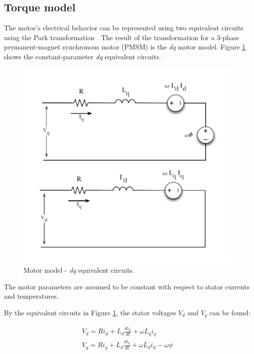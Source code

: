 \documentclass[../SimBALink.tex]{subfiles}
\begin{document}
	\subsection{Torque model}
		The motor's electrical behavior can be represented using two equivalent circuits using the Park transformation \cite{Park1929}. The result of the transformation for a 3-phase permanent-magnet synchronous motor (PMSM) is the \textit{dq} motor model. Figure \ref{fig:Motor_equivalent_circuit} shows the constant-parameter \textit{dq} equivalent circuits.
		
		\begin{figure}[h]
			\centering
			\includegraphics[width=\linewidth]{Motor_equivalent_circuit}
			\caption{Motor model - \textit{dq} equivalent circuits.}
			\label{fig:Motor_equivalent_circuit}
		\end{figure}
		\FloatBarrier
		
		The motor parameters are assumed to be constant with respect to stator currents and temperatures.
		
		By the equivalent circuits in Figure \ref{fig:Motor_equivalent_circuit}, the stator voltages $V_d$ and $V_q$ can be found:
		
		\begin{gather}
			V_d		= R i_d + L_d \frac{ d i_d }{ d t } + \omega L_q i_q				\label{eqn:Vd_with_Vl}\\
			V_q		= R i_q + L_d \frac{ d i_q }{ d t } + \omega L_d i_d	- \omega \phi	\label{eqn:Vq_with_Vl}
		\end{gather}
		
\end{document}
